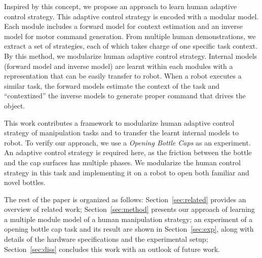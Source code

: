Inspired by this concept, we propose an approach to learn human adaptive control strategy. This adaptive control strategy is encoded with a modular model. Each module includes a forward model for context estimation and an inverse model for motor command generation. From multiple human demonstrations, we extract a set of strategies, each of which takes charge of one specific task context. By this method, we modularize human adaptive control strategy. Internal models (forward model and inverse model) are learnt within each modules with a representation that can be easily transfer to robot. When a robot executes a similar task, the forward models estimate the context of the task and ``contextized'' the inverse models to generate proper command that drives the object.

This work contributes a framework to modularize human adaptive control strategy of manipulation tasks and to transfer the learnt internal models to robot. To verify our approach, we use a \emph{Opening Bottle Caps} as an experiment. An adaptive control strategy is required here, as the friction between the bottle and the cap surfaces has multiple phases. We modularize the human control strategy in this task and implementing it on a robot to open both familiar and novel bottles.

The rest of the paper is organized as follows: Section~\ref{sec:related} provides an overview of related work; Section~\ref{sec:method} presents our approach of learning a multiple module model of a human manipulation strategy; an experiment of a opening bottle cap task and its result are shown in Section~\ref{sec:exp}, along with details of the hardware specifications and the experimental setup; Section~\ref{sec:diss} concludes this work with an outlook of future work. 